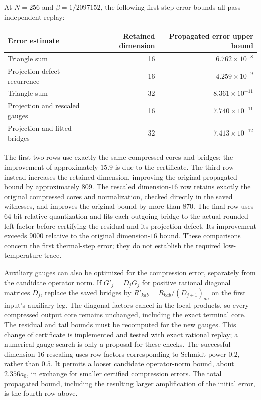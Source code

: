 \documentclass[11pt]{article}
\begin{document}
At $N=256$ and $\beta=1/2097152$, the following first-step error bounds
all pass independent replay:
\begin{center}
\begin{tabular}{lrr}
\toprule
Error estimate & Retained dimension & Propagated error upper bound\\
\midrule
Triangle sum & 16 & $6.762\times10^{-8}$\\
Projection-defect recurrence & 16 & $4.259\times10^{-9}$\\
Triangle sum & 32 & $8.361\times10^{-11}$\\
Projection and rescaled gauges & 16 & $7.740\times10^{-11}$\\
Projection and fitted bridges & 32 & $7.413\times10^{-12}$\\
\bottomrule
\end{tabular}
\end{center}
The first two rows use exactly the same compressed cores and bridges;
the improvement of approximately $15.9$ is due to the certificate.
The third row instead increases the retained dimension, improving the
original propagated bound by approximately $809$.
The rescaled dimension-$16$ row retains exactly the original compressed
cores and normalization, checked directly in the saved witnesses, and
improves the original bound by more than $870$. The final row uses
$64$-bit relative quantization and fits each outgoing bridge to the
actual rounded left factor before certifying the residual and its
projection defect. Its improvement exceeds $9000$ relative to the
original dimension-$16$ bound. These comparisons concern the first
thermal-step error; they do not establish the required low-temperature trace.

Auxiliary gauges can also be optimized for the compression error,
separately from the candidate operator norm. If $G'_j=D_jG_j$ for
positive rational diagonal matrices $D_j$, replace the saved bridges by
$R'_{kab}=R_{kab}/(D_{j+1})_{aa}$ on the first input's auxiliary leg.
The diagonal factors cancel in the local products, so every compressed
output core remains unchanged, including the exact terminal core.
The residual and tail bounds must be recomputed for the new gauges.
This change of certificate is implemented and tested with exact rational
replay; a numerical gauge search is only a proposal for these checks.
The successful dimension-$16$ rescaling uses row factors corresponding
to Schmidt power $0.2$, rather than $0.5$. It permits a looser candidate
operator-norm bound, about $2.356a_0$, in exchange for smaller certified
compression errors. The total propagated bound, including the resulting
larger amplification of the initial error, is the fourth row above.
\end{document}
